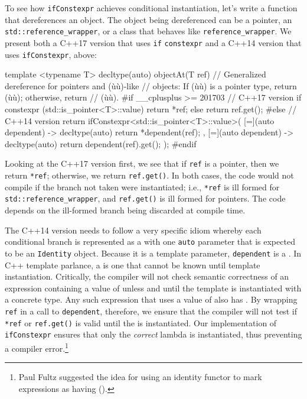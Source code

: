 {To see how \lstinline!ifConstexpr! achieves conditional instantiation,
let's write a function that dereferences an object. The object being
dereferenced can be a pointer, an \lstinline!std::reference_wrapper!, or a
class that behaves like \lstinline!reference_wrapper!. We present both a
C++17 version that uses \lstinline!if! \lstinline!constexpr! and a C++14
version that uses \lstinline!ifConstexpr!, above:

\begin{emcppslisting}[emcppsbatch=e7]
template <typename T>
decltype(auto) objectAt(T ref)
    // Generalized dereference for pointers and (ù{}ù)-like
    // objects: If (ù{}ù) is a pointer type, return (ù{}ù); otherwise, return
    // (ù{}ù).
{
#if __cplusplus >= 201703
    // C++17 version
    if constexpr (std::is_pointer<T>::value) { return *ref; }
    else                                     { return ref.get(); }
#else
    // C++14 version
    return ifConstexpr<std::is_pointer<T>::value>(
        [=](auto dependent) -> decltype(auto) { return *dependent(ref); },
        [=](auto dependent) -> decltype(auto) { return dependent(ref).get(); });
#endif
}
\end{emcppslisting}
    

\noindent Looking at the C++17 version first, we see that if \lstinline!ref! is a
pointer, then we return \lstinline!*ref!; otherwise, we return
\lstinline!ref.get()!. In both cases, the code would not compile if the
branch not taken were instantiated; i.e., \lstinline!*ref! is ill formed
for \lstinline!std::reference_wrapper!, and \lstinline!ref.get()! is ill
formed for pointers. The code depends on the ill-formed branch being
discarded at compile time.

The C++14 version needs to follow a very specific idiom whereby
each conditional branch is represented as a  with
one \lstinline!auto! parameter that is expected to be an \lstinline!Identity!
object. Because it is a template parameter, \lstinline!dependent! is a
. In C++ template parlance, a  is one that cannot be known until template instantiation.
Critically, the compiler will not check semantic correctness of an
expression containing a value of  unless and
until the template is instantiated with a concrete type. Any such
expression that uses a value of  also has
. By wrapping \lstinline!ref! in a call to
\lstinline!dependent!, therefore, we ensure that the compiler will not test
if \lstinline!*ref! or \lstinline!ref.get()! is valid until the
 is instantiated. Our implementation of
\lstinline!ifConstexpr! ensures that only the \emph{correct} lambda is
instantiated, thus preventing a compiler error.{\cprotect\footnote{Paul
Fultz suggested the idea for using an identity functor to mark
  expressions as having  (\cite{fultz14}).}}

}

